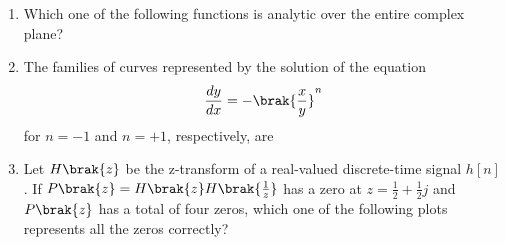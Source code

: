 \documentclass[a4paper, 11pt]{article}
\begin{document}
\begin{enumerate}

    
    \item Which one of the following functions is analytic over the entire complex plane?

    \begin{enumerate}
    \end{enumerate}

    \hfill{}

    \item The families of curves represented by the solution of the equation
    \[
    \frac{dy}{dx}=-\brak{\frac{x}{y}}^{n}
    \]
    for $n=-1$ and $n=+1$, respectively, are
    \begin{enumerate}
    \end{enumerate}

    \hfill{}

    \item Let $H\brak{z}$ be the z-transform of a real-valued discrete-time signal $h[n]$. If $P\brak{z}=H\brak{z}H\brak{\frac{1}{z}}$ has a zero at $z=\frac{1}{2}+\frac{1}{2}j$ and $P\brak{z}$ has a total of four zeros, which one of the following plots represents all the zeros correctly?
    \begin{enumerate}
    \end{enumerate}


\end{enumerate}
\end{document}
